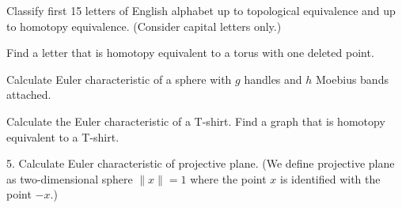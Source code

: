 \exercises
\begin{xca}
Classify first 15 letters of English alphabet up to topological
equivalence and up to homotopy equivalence.
(Consider capital letters only.)
\end{xca}
\begin{xca}
Find a letter that is homotopy equivalent to a torus with one deleted point.
\end{xca}
\begin{xca}
Calculate Euler characteristic of a sphere with $g$ handles and $h$
Moebius bands attached.
\end{xca}
\begin{xca}
Calculate the Euler characteristic of a T-shirt. Find a graph that is
homotopy equivalent to a T-shirt.
\end{xca}
\begin{xca}
5. Calculate Euler characteristic of projective plane. (We define
projective plane as two-dimensional sphere
$\|x\|=1$ where the point $x$ is identified with the point $-x$.)
\end{xca}
